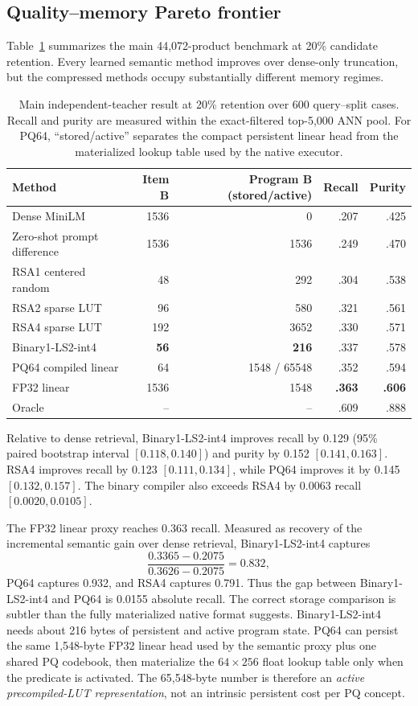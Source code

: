 
\subsection{Quality--memory Pareto frontier}
Table~\ref{tab:pareto20} summarizes the main 44,072-product benchmark at 20\% candidate retention. Every learned semantic method improves over dense-only truncation, but the compressed methods occupy substantially different memory regimes.

\begin{table}[t]
\centering
\caption{Main independent-teacher result at 20\% retention over 600 query--split cases. Recall and purity are measured within the exact-filtered top-5,000 ANN pool. For PQ64, ``stored/active'' separates the compact persistent linear head from the materialized lookup table used by the native executor.}
\label{tab:pareto20}
\small
\begin{tabular}{lrrrr}
\toprule
Method & Item B & Program B (stored/active) & Recall & Purity\\
\midrule
Dense MiniLM & 1536 & 0 & .207 & .425\\
Zero-shot prompt difference & 1536 & 1536 & .249 & .470\\
RSA1 centered random & 48 & 292 & .304 & .538\\
RSA2 sparse LUT & 96 & 580 & .321 & .561\\
RSA4 sparse LUT & 192 & 3652 & .330 & .571\\
Binary1-LS2-int4 & \textbf{56} & \textbf{216} & .337 & .578\\
PQ64 compiled linear & 64 & 1548 / 65548 & .352 & .594\\
FP32 linear & 1536 & 1548 & \textbf{.363} & \textbf{.606}\\
Oracle & -- & -- & .609 & .888\\
\bottomrule
\end{tabular}
\end{table}

Relative to dense retrieval, Binary1-LS2-int4 improves recall by 0.129 (95\% paired bootstrap interval $[0.118,0.140]$) and purity by 0.152 $[0.141,0.163]$. RSA4 improves recall by 0.123 $[0.111,0.134]$, while PQ64 improves it by 0.145 $[0.132,0.157]$. The binary compiler also exceeds RSA4 by 0.0063 recall $[0.0020,0.0105]$.

The FP32 linear proxy reaches 0.363 recall. Measured as recovery of the incremental semantic gain over dense retrieval, Binary1-LS2-int4 captures
\begin{equation}
\frac{0.3365-0.2075}{0.3626-0.2075}=0.832,
\end{equation}
PQ64 captures 0.932, and RSA4 captures 0.791. Thus the gap between Binary1-LS2-int4 and PQ64 is 0.0155 absolute recall. The correct storage comparison is subtler than the fully materialized native format suggests. Binary1-LS2-int4 needs about 216 bytes of persistent and active program state. PQ64 can persist the same 1,548-byte FP32 linear head used by the semantic proxy plus one shared PQ codebook, then materialize the $64\times256$ float lookup table only when the predicate is activated. The 65,548-byte number is therefore an \emph{active precompiled-LUT representation}, not an intrinsic persistent cost per PQ concept.


